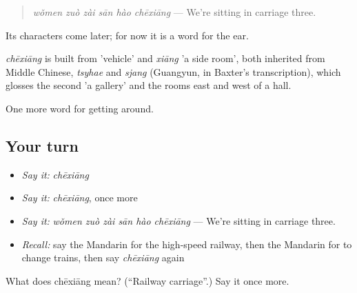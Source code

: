 \begin{quote}
\emph{wǒmen zuò zài sān hào chēxiāng} — We're sitting in carriage three.
\end{quote}

Its characters come later; for now it is a word for the ear.

\begin{cousinweb}
\emph{chēxiāng} is built from  'vehicle' and \emph{xiāng} 'a side room', both inherited from Middle Chinese, \emph{tsyhae} and \emph{sjang} (Guangyun, in Baxter's transcription), which glosses the second 'a gallery' and the rooms east and west of a hall.
\end{cousinweb}

\begin{grammarlens}[title={What you've built}]
One more word for getting around.
\end{grammarlens}

\subsection*{Your turn}
\begin{itemize}
\raggedright
  \item \emph{Say it:} \emph{chēxiāng}
  \item \emph{Say it:} \emph{chēxiāng}, once more
  \item \emph{Say it:} \emph{wǒmen zuò zài sān hào chēxiāng} — We're sitting in carriage three.
  \item \emph{Recall:} say the Mandarin for the high-speed railway, then the Mandarin for to change trains, then say \emph{chēxiāng} again
\end{itemize}

\begin{tcolorbox}[breakable,colback=teal!4,colframe=teal!35!black,title={Before you move on}]
What does chēxiāng mean? (\textquotedblleft{}Railway carriage\textquotedblright{}.) Say it once more.
\end{tcolorbox}
